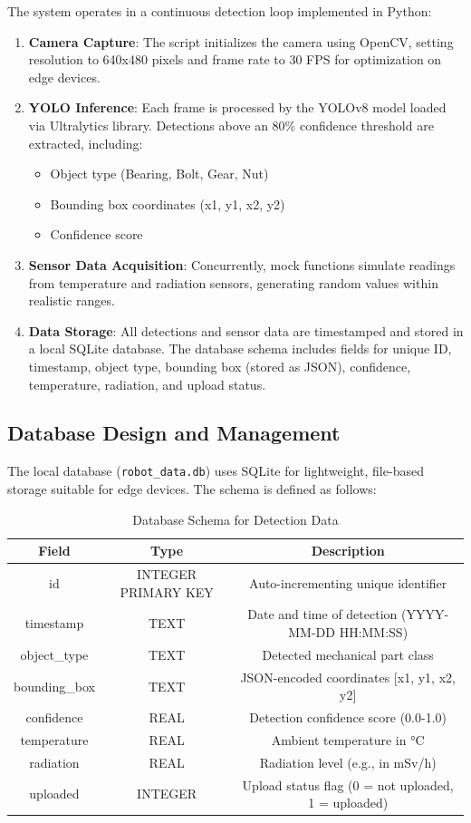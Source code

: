 \documentclass[12pt,a4paper]{article}
\begin{document}
The system operates in a continuous detection loop implemented in Python:
\begin{enumerate}
\item \textbf{Camera Capture}: The script initializes the camera using OpenCV, setting resolution to 640x480 pixels and frame rate to 30 FPS for optimization on edge devices.
\item \textbf{YOLO Inference}: Each frame is processed by the YOLOv8 model loaded via Ultralytics library. Detections above an 80\% confidence threshold are extracted, including:
  \begin{itemize}
  \item Object type (Bearing, Bolt, Gear, Nut)
  \item Bounding box coordinates (x1, y1, x2, y2)
  \item Confidence score
  \end{itemize}
\item \textbf{Sensor Data Acquisition}: Concurrently, mock functions simulate readings from temperature and radiation sensors, generating random values within realistic ranges.
\item \textbf{Data Storage}: All detections and sensor data are timestamped and stored in a local SQLite database. The database schema includes fields for unique ID, timestamp, object type, bounding box (stored as JSON), confidence, temperature, radiation, and upload status.
\end{enumerate}

\subsection{Database Design and Management}

The local database (\texttt{robot\_data.db}) uses SQLite for lightweight, file-based storage suitable for edge devices. The schema is defined as follows:

\begin{table}[H]
\centering
\begin{tabular}{|c|c|c|}
\hline
Field & Type & Description \\
\hline
id & INTEGER PRIMARY KEY & Auto-incrementing unique identifier \\
\hline
timestamp & TEXT & Date and time of detection (YYYY-MM-DD HH:MM:SS) \\
\hline
object\_type & TEXT & Detected mechanical part class \\
\hline
bounding\_box & TEXT & JSON-encoded coordinates [x1, y1, x2, y2] \\
\hline
confidence & REAL & Detection confidence score (0.0-1.0) \\
\hline
temperature & REAL & Ambient temperature in °C \\
\hline
radiation & REAL & Radiation level (e.g., in mSv/h) \\
\hline
uploaded & INTEGER & Upload status flag (0 = not uploaded, 1 = uploaded) \\
\hline
\end{tabular}
\caption{Database Schema for Detection Data}
\end{table}
\end{document}
